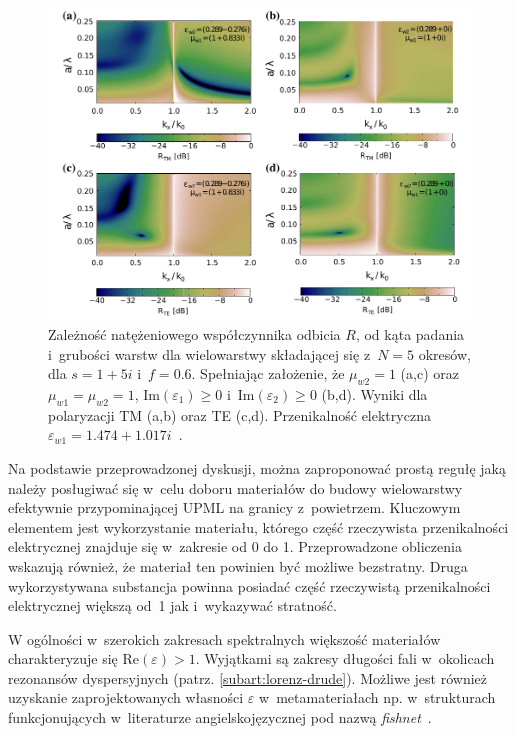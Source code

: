 \begin{figure}[tb]
	\includegraphics[width=\textwidth]{images/pml/fig5.png}
	\caption{Zależność natężeniowego współczynnika odbicia $R$, od kąta padania i~grubości warstw dla wielowarstwy składającej się z~$N=5$ okresów, dla $s=1+5i$ i~$f=0.6$. Spełniając założenie, że $\mu_{w2}=1$ (a,c) oraz $\mu_{w1}=\mu_{w2}=1$, $\textrm{Im}(\varepsilon_1)\ge 0 $ i~$\textrm{Im}(\varepsilon_2)\ge 0 $ (b,d). Wyniki dla polaryzacji TM (a,b) oraz TE (c,d). Przenikalność elektryczna $\varepsilon_{w1}=1.474+1.017i$~\cite{ania2015}.}
	\label{fig:pml-real-ref}
\end{figure}


Na podstawie przeprowadzonej dyskusji, można zaproponować prostą regułę jaką należy posługiwać się w~celu doboru materiałów do budowy wielowarstwy efektywnie przypominającej UPML na granicy z~powietrzem. Kluczowym elementem jest wykorzystanie materiału, którego część rzeczywista przenikalności elektrycznej znajduje się w~zakresie od 0 do 1. Przeprowadzone obliczenia wskazują również, że materiał ten powinien być możliwe bezstratny. Druga wykorzystywana substancja powinna posiadać część rzeczywistą przenikalności elektrycznej większą od~1 jak i~wykazywać stratność. 

W ogólności w~szerokich zakresach spektralnych większość materiałów charakteryzuje się $\textrm{Re}(\varepsilon) > 1$. Wyjątkami są zakresy długości fali w~okolicach rezonansów dyspersyjnych (patrz. \ref{subart:lorenz-drude}). Możliwe jest również uzyskanie zaprojektowanych własności $\varepsilon$ w~metamateriałach np. w~strukturach funkcjonujących w~literaturze angielskojęzycznej pod nazwą \textit{fishnet}~\cite{valentine2008three}. 

